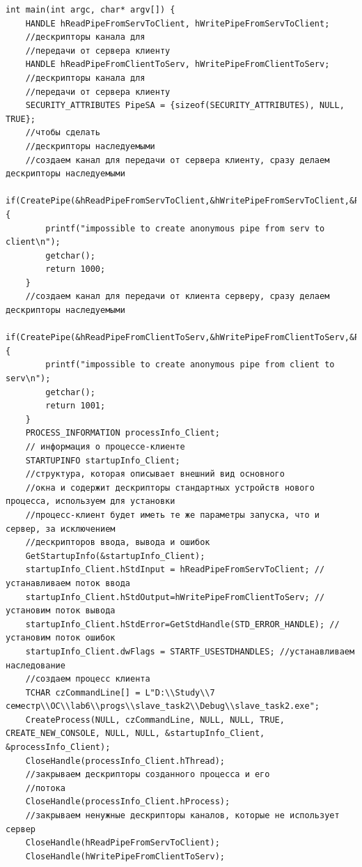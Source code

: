 \documentclass[a4paper]{article}
\begin{document}
\begin{lstlisting}[style=crs_cpp]
int main(int argc, char* argv[]) { 
	HANDLE hReadPipeFromServToClient, hWritePipeFromServToClient; 
	//дескрипторы канала для 
	//передачи от сервера клиенту 
	HANDLE hReadPipeFromClientToServ, hWritePipeFromClientToServ; 
	//дескрипторы канала для 
	//передачи от сервера клиенту 
	SECURITY_ATTRIBUTES PipeSA = {sizeof(SECURITY_ATTRIBUTES), NULL, TRUE}; 
	//чтобы сделать 
	//дескрипторы наследуемыми 
	//создаем канал для передачи от сервера клиенту, сразу делаем дескрипторы наследуемыми 
	if(CreatePipe(&hReadPipeFromServToClient,&hWritePipeFromServToClient,&PipeSA,0)==0) { 
		printf("impossible to create anonymous pipe from serv to client\n"); 
		getchar();
		return 1000;
	} 
	//создаем канал для передачи от клиента серверу, сразу делаем дескрипторы наследуемыми 
	if(CreatePipe(&hReadPipeFromClientToServ,&hWritePipeFromClientToServ,&PipeSA,0)==0) { 
		printf("impossible to create anonymous pipe from client to serv\n"); 
		getchar();
		return 1001;
	} 
	PROCESS_INFORMATION processInfo_Client;
	// информация о процессе-клиенте
	STARTUPINFO startupInfo_Client; 
	//структура, которая описывает внешний вид основного 
	//окна и содержит дескрипторы стандартных устройств нового процесса, используем для установки 
	//процесс-клиент будет иметь те же параметры запуска, что и сервер, за исключением
	//дескрипторов ввода, вывода и ошибок 
	GetStartupInfo(&startupInfo_Client);
	startupInfo_Client.hStdInput = hReadPipeFromServToClient; //устанавливаем поток ввода
	startupInfo_Client.hStdOutput=hWritePipeFromClientToServ; //установим поток вывода 
	startupInfo_Client.hStdError=GetStdHandle(STD_ERROR_HANDLE); //установим поток ошибок 
	startupInfo_Client.dwFlags = STARTF_USESTDHANDLES; //устанавливаем наследование 
	//создаем процесс клиента
	TCHAR czCommandLine[] = L"D:\\Study\\7 семестр\\ОС\\lab6\\progs\\slave_task2\\Debug\\slave_task2.exe";
	CreateProcess(NULL, czCommandLine, NULL, NULL, TRUE, CREATE_NEW_CONSOLE, NULL, NULL, &startupInfo_Client, &processInfo_Client);
	CloseHandle(processInfo_Client.hThread); 
	//закрываем дескрипторы созданного процесса и его 
	//потока
	CloseHandle(processInfo_Client.hProcess); 
	//закрываем ненужные дескрипторы каналов, которые не использует сервер
	CloseHandle(hReadPipeFromServToClient); 
	CloseHandle(hWritePipeFromClientToServ); 

\end{lstlisting}
\end{document}
